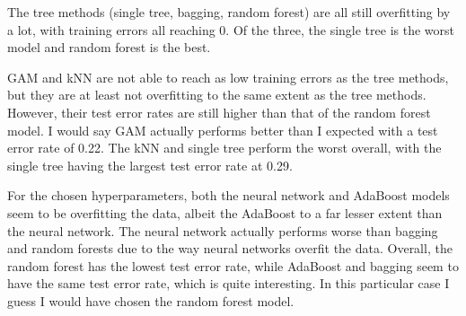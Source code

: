 \documentclass[11pt]{article}
\begin{document}
    The tree methods (single tree, bagging, random forest) are all still
overfitting by a lot, with training errors all reaching 0. Of the three,
the single tree is the worst model and random forest is the best.

GAM and kNN are not able to reach as low training errors as the tree
methods, but they are at least not overfitting to the same extent as the
tree methods. However, their test error rates are still higher than that
of the random forest model. I would say GAM actually performs better
than I expected with a test error rate of 0.22. The kNN and single tree
perform the worst overall, with the single tree having the largest test
error rate at 0.29.

For the chosen hyperparameters, both the neural network and AdaBoost
models seem to be overfitting the data, albeit the AdaBoost to a far
lesser extent than the neural network. The neural network actually
performs worse than bagging and random forests due to the way neural
networks overfit the data. Overall, the random forest has the lowest
test error rate, while AdaBoost and bagging seem to have the same test
error rate, which is quite interesting. In this particular case I guess
I would have chosen the random forest model.


    
    
    
\end{document}
